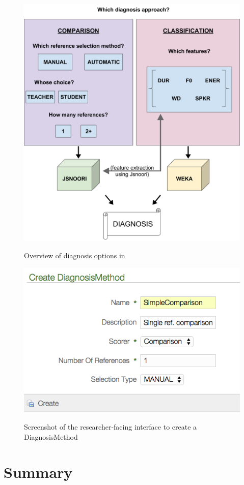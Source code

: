 	\begin{figure}
		\centering
		\caption[Overview of diagnosis options]{Overview of diagnosis options in  }
		\includegraphics[width=\textwidth]{img/DiagnosisMethod}
		\label{fig:diag:system}
	\end{figure}
	
	\begin{figure}
		\centering
		\caption[Creating a DiagnosisMethod]{Screenshot of the researcher-facing interface to create a DiagnosisMethod}
		\includegraphics[width=.8\textwidth]{img/screenshots/createDiagnosisMethod}
		\label{fig:diag:creatediagnosismethod}
	\end{figure}
	
	

\section{Summary}
\label{sec:diag:summary}


	\TODO{}